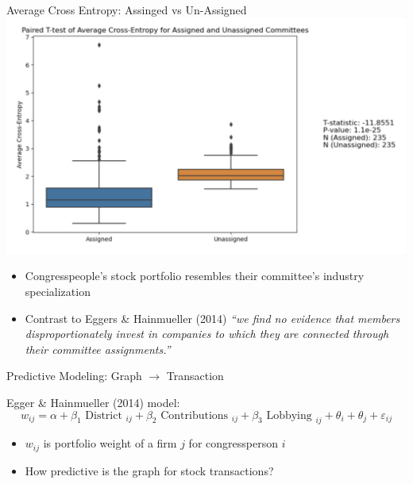 \documentclass{beamer}
\begin{document}
	\begin{frame}{Average Cross Entropy: Assinged vs Un-Assigned}
		\centering	\includegraphics[scale=0.4]{./images/aua.png}
		\begin{itemize}
			\item Congresspeople's stock portfolio resembles their committee's industry specialization
			\item Contrast to Eggers \& Hainmueller (2014) \textit{``we find no evidence that members disproportionately invest in companies to which they are connected through their committee assignments.''}
		\end{itemize}
	\end{frame}

	\begin{frame}{Predictive Modeling: Graph $\rightarrow$ Transaction}

		Egger \& Hainmueller (2014) model:
		$$w_{i j}=\alpha+\beta_1 \text { District }_{i j}+\beta_2 \text { Contributions }_{i j}+\beta_3 \text { Lobbying }_{i j}+\theta_i+\theta_j+\varepsilon_{i j}$$

		\begin{itemize}
			\item $w_{ij}$ is portfolio weight of a firm $j$ for congressperson $i$
			\item How predictive is the graph for stock transactions? 
		\end{itemize}

	\end{frame}	
\end{document}
